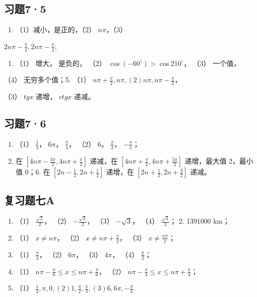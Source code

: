 \subsection{习题7·5}

\begin{enumerate}[start=1]
\item
  （1）减小，是正的，（2） \(n\pi\)，（3）
\end{enumerate}
\(2n\pi -\frac{\pi}{2},2n\pi -\frac{\pi}{2};\)

\begin{enumerate}[start=2]
\item
  （1） 增大， 是负的， （2） \(\cos(-60^{\circ}) > \cos 210^{\circ}\)，
  （3） 一个值，
\end{enumerate}

（4） 无穷多个值；5. （1）
\(n\pi + \frac{\pi}{2}, n\pi, (2) n\pi, n\pi - \frac{\pi}{2}\)，

（3） \(tg x\) 递增， \(ctg x\) 递减。

\subsection{习题7·6}

\begin{enumerate}[start=3]
\item
  （1） \(\frac{1}{3}\)， \(6\pi\)， \(\frac{\pi}{4}\)， （2） \(6\)，
  \(\frac{\pi}{2}\)， \(-\frac{\pi}{5}\)；
\item
  在 \(\left[4n\pi - \frac{3\pi}{2}, 4n\pi + \frac{\pi}{2}\right]\)
  递减，在
  \(\left[4n\pi + \frac{\pi}{2}, 4n\pi + \frac{5\pi}{2}\right]\)
  递增，最大值 2，最小值 0；6. 在
  \(\left[2n - \frac{1}{2}, 2n + \frac{1}{2}\right]\) 递增，在
  \(\left[2n + \frac{1}{2}, 2n + \frac{3}{2}\right]\) 递减。
\end{enumerate}

\subsection{复习题七A}

\begin{enumerate}
\item
  （1） \(\frac{\sqrt{2}}{2}\)， （2） \(-\frac{\sqrt{3}}{2}\)， （3）
  \(-\sqrt{3}\)， （4） \(\frac{\sqrt{3}}{3}\)； 2. 1391000 km；
\item
  （1） \(x \neq n\pi\)， （2） \(x \neq n\pi + \frac{\pi}{2}\)， （3）
  \(x \neq \frac{n\pi}{2}\)；
\item
  （1） \(\frac{\pi}{2}\)， （2） \(6\pi\)， （3） \(4\pi\)， （4）
  \(\frac{\pi}{2}\)；
\item
  （1）
  \(n\pi - \frac{\pi}{6} \leqslant x \leqslant n\pi + \frac{\pi}{6}\)，
  （2）
  \(n\pi - \frac{\pi}{4} \leqslant x \leqslant n\pi + \frac{\pi}{4}\)；
\item
  （1）
  \(\frac{1}{3}, \pi, 0, (2) 1, \frac{\pi}{2}, \frac{\pi}{3}, (3) 6, 6\pi, -\frac{\pi}{4}\).
\end{enumerate}

